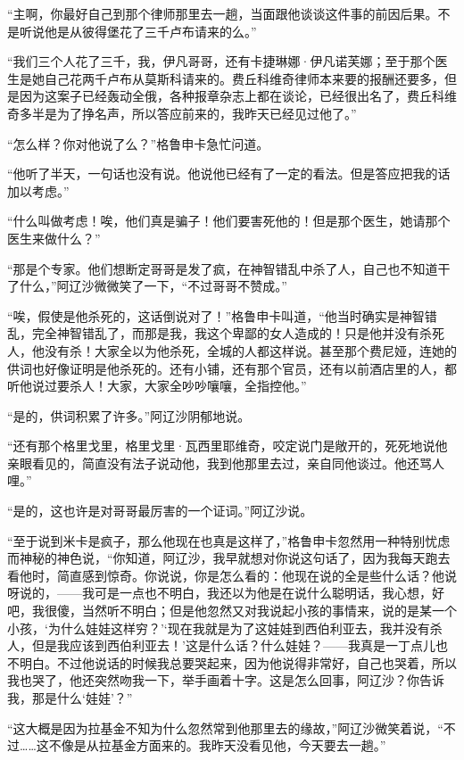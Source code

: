\par “主啊，你最好自己到那个律师那里去一趟，当面跟他谈谈这件事的前因后果。不是听说他是从彼得堡花了三千卢布请来的么。”
\par “我们三个人花了三千，我，伊凡哥哥，还有卡捷琳娜·伊凡诺芙娜；至于那个医生是她自己花两千卢布从莫斯科请来的。费丘科维奇律师本来要的报酬还要多，但是因为这案子已经轰动全俄，各种报章杂志上都在谈论，已经很出名了，费丘科维奇多半是为了挣名声，所以答应前来的，我昨天已经见过他了。”
\par “怎么样？你对他说了么？”格鲁申卡急忙问道。
\par “他听了半天，一句话也没有说。他说他已经有了一定的看法。但是答应把我的话加以考虑。”
\par “什么叫做考虑！唉，他们真是骗子！他们要害死他的！但是那个医生，她请那个医生来做什么？”
\par “那是个专家。他们想断定哥哥是发了疯，在神智错乱中杀了人，自己也不知道干了什么，”阿辽沙微微笑了一下，“不过哥哥不赞成。”
\par “唉，假使是他杀死的，这话倒说对了！”格鲁申卡叫道，“他当时确实是神智错乱，完全神智错乱了，而那是我，我这个卑鄙的女人造成的！只是他并没有杀死人，他没有杀！大家全以为他杀死，全城的人都这样说。甚至那个费尼娅，连她的供词也好像证明是他杀死的。还有小铺，还有那个官员，还有以前酒店里的人，都听他说过要杀人！大家，大家全吵吵嚷嚷，全指控他。”
\par “是的，供词积累了许多。”阿辽沙阴郁地说。
\par “还有那个格里戈里，格里戈里·瓦西里耶维奇，咬定说门是敞开的，死死地说他亲眼看见的，简直没有法子说动他，我到他那里去过，亲自同他谈过。他还骂人哩。”
\par “是的，这也许是对哥哥最厉害的一个证词。”阿辽沙说。
\par “至于说到米卡是疯子，那么他现在也真是这样了，”格鲁申卡忽然用一种特别忧虑而神秘的神色说，“你知道，阿辽沙，我早就想对你说这句话了，因为我每天跑去看他时，简直感到惊奇。你说说，你是怎么看的：他现在说的全是些什么话？他说呀说的，——我可是一点也不明白，我还以为他是在说什么聪明话，我心想，好吧，我很傻，当然听不明白；但是他忽然又对我说起小孩的事情来，说的是某一个小孩，‘为什么娃娃这样穷？’‘现在我就是为了这娃娃到西伯利亚去，我并没有杀人，但是我应该到西伯利亚去！’这是什么话？什么娃娃？——我真是一丁点儿也不明白。不过他说话的时候我总要哭起来，因为他说得非常好，自己也哭着，所以我也哭了，他还突然吻我一下，举手画着十字。这是怎么回事，阿辽沙？你告诉我，那是什么‘娃娃’？”
\par “这大概是因为拉基金不知为什么忽然常到他那里去的缘故，”阿辽沙微笑着说，“不过……这不像是从拉基金方面来的。我昨天没看见他，今天要去一趟。”
